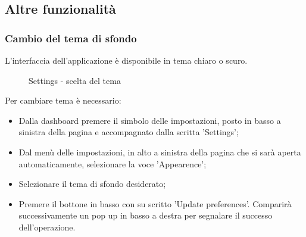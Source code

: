\documentclass[10pt, a4paper]{article}
\begin{document}
\subsection{Altre funzionalità}
\subsubsection{Cambio del tema di sfondo}
L'interfaccia dell'applicazione è disponibile in tema chiaro o scuro.\\
\begin{figure}[H]
    \centering  
    \caption{Settings - scelta del tema}
\end{figure}
 Per cambiare tema è necessario:
\begin{itemize}
    \item Dalla dashboard premere il simbolo delle impostazioni, posto in basso a sinistra della pagina e accompagnato dalla scritta 'Settings';
    \item Dal menù delle impostazioni, in alto a sinistra della pagina che si sarà aperta automaticamente, selezionare la voce 'Appearence';
    \item Selezionare il tema di sfondo desiderato;
    \item Premere il bottone in basso con su scritto 'Update preferences'. Comparirà successivamente un pop up in basso a destra per segnalare il successo dell'operazione.
\end{itemize}
\end{document}
